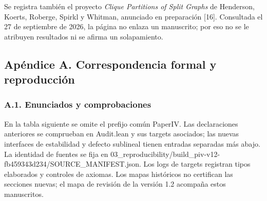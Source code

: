 \documentclass[spanish,11pt,a4paper]{article}
\begin{document}
Se registra también el proyecto \emph{Clique Partitions of Split Graphs} de Henderson, Koerts, Roberge, Spirkl y Whitman, anunciado en preparación {[}16{]}. Consultada el 27 de septiembre de 2026, la página no enlaza un manuscrito; por eso no se le atribuyen resultados ni se afirma un solapamiento.

\subsection{Apéndice A. Correspondencia formal y reproducción}\label{apendice-a.-correspondencia-formal-y-reproduccion}

\subsubsection{A.1. Enunciados y comprobaciones}\label{a.1.-enunciados-y-comprobaciones}

En la tabla siguiente se omite el prefijo común {\ttfamily\small PaperIV}. Las declaraciones anteriores se comprueban en {\ttfamily\small Audit.\discretionary{\hbox{\ensuremath{\hookrightarrow}}}{}{}lean} y sus targets asociados; las nuevas interfaces de estabilidad y defecto sublineal tienen entradas separadas más abajo. La identidad de fuentes se fija en {\ttfamily\small 03\_\discretionary{\hbox{\ensuremath{\hookrightarrow}}}{}{}reproducibil\discretionary{\hbox{\ensuremath{\hookrightarrow}}}{}{}ity/\discretionary{\hbox{\ensuremath{\hookrightarrow}}}{}{}build\_\discretionary{\hbox{\ensuremath{\hookrightarrow}}}{}{}piv-\discretionary{\hbox{\ensuremath{\hookrightarrow}}}{}{}v12-\discretionary{\hbox{\ensuremath{\hookrightarrow}}}{}{}fb459343d234\discretionary{\hbox{\ensuremath{\hookrightarrow}}}{}{}/\discretionary{\hbox{\ensuremath{\hookrightarrow}}}{}{}SOURCE\_\discretionary{\hbox{\ensuremath{\hookrightarrow}}}{}{}MANIFEST.\discretionary{\hbox{\ensuremath{\hookrightarrow}}}{}{}json}. Los logs de targets registran tipos elaborados y controles de axiomas. Los mapas históricos no certifican las secciones nuevas; el mapa de revisión de la versión 1.2 acompaña estos manuscritos.
\end{document}
